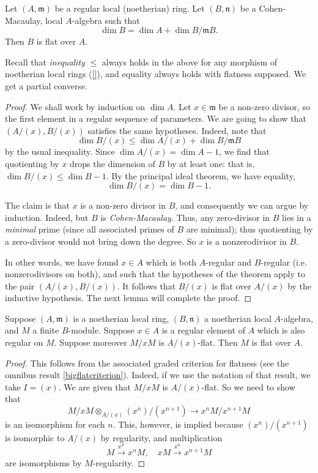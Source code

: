\begin{theorem}
Let $(A, \mathfrak{m})$  be a regular local (noetherian) ring. Let $(B,
\mathfrak{n})$ be a Cohen-Macaulay, local $A$-algebra such that 
\[ \dim B = \dim A + \dim B/\mathfrak{m}B . \]
Then $B$ is flat over $A$.
\end{theorem} 
Recall that \emph{inequality} $\leq$ always holds in the above for any
morphism of noetherian local rings (\cref{}), and
equality always holds with flatness supposed. 
We get a partial converse.

\begin{proof} 
We shall work by induction on $\dim A$. 
Let $x \in \mathfrak{m}$ be a non-zero divisor, so the first element in a
regular sequence of parameters. 
We are going to show that $(A/(x), B/(x))$ satisfies the same hypotheses. 
Indeed, note that 
\[ \dim B/(x) \leq \dim A/(x) + \dim B/\mathfrak{m}B  \]
by the usual inequality. Since $\dim A/(x) = \dim A - 1$, 
we find that quotienting by $x$ drops the dimension of $B$ by at least one: that is,
$\dim B/(x) \leq \dim B - 1$. By the principal ideal theorem, we have equality,
\[ \dim B/(x) = \dim B - 1.  \]

The claim is that $x$ is a non-zero divisor in $B$, and consequently we can
argue by induction.
Indeed, but $B$ is \emph{Cohen-Macaulay}. Thus, any zero-divisor in $B$ lies in a
\emph{minimal} prime (since all associated primes of $B$ are minimal); thus
quotienting by a zero-divisor would not bring down the degree. So $x$ is a
nonzerodivisor in $B$.

In other words, we have found $x \in A$ which is both $A$-regular and
$B$-regular (i.e. nonzerodivisors on both), and such that the hypotheses of the theorem apply to the pair
$(A/(x), B/(x))$. It follows that $B/(x)$ is flat over $A/(x)$ by the 
inductive hypothesis. The next lemma will complete the proof.
\end{proof} 


\begin{lemma} 
Suppose $(A, \mathfrak{m})$ is a noetherian local ring, $(B, \mathfrak{n})$ a
noetherian local $A$-algebra, and $M$ a finite $B$-module. Suppose $x \in A$ is
a regular element of $A$ which is also regular on $M$.
Suppose moreover $M/xM$ is $A/(x)$-flat. Then $M$ is flat over $A$.
\end{lemma} 
\begin{proof} 
This follows from the associated graded criterion for flatness (see the
omnibus result \cref{bigflatcriterion}).
Indeed, if we use the notation of that result, we take $I = (x)$.
We are given that $M/xM$ is $A/(x)$-flat. So we need to show that
\[ M/xM \otimes_{A/(x)}  (x^n)/(x^{n+1}) \to x^n M/x^{n+1}M \]
is an isomorphism for each $n$. This, however, is implied because
$(x^n)/(x^{n+1})$ is isomorphic to $A/(x)$ by regularity, and multiplication 
\[ M \stackrel{x^n}{\to} x^n M, \quad xM \stackrel{x^n}{\to} x^{n+1}M \]
are isomorphisms by $M$-regularity. 
\end{proof} 
